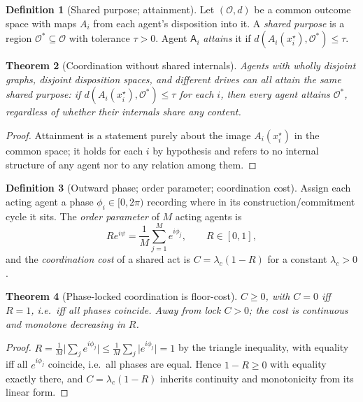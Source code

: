 \documentclass[11pt,a4paper]{article}
\theoremstyle{clstyle}
\newtheorem{theorem}{Theorem}[section]
\theoremstyle{definition}
\newtheorem{definition}[theorem]{Definition}
\theoremstyle{remark}
\newcommand{\Ag}{\mathsf{A}}
\newcommand{\Ord}{R}
\newcommand{\abs}[1]{\lvert#1\rvert}
\begin{document}
\begin{definition}[Shared purpose; attainment]
\label{def:shared}
Let $(\mathcal{O},d)$ be a common outcome space with maps
$A_i$ from each agent's disposition into it. A \emph{shared purpose} is a
region $\mathcal{O}^{*}\subseteq\mathcal{O}$ with tolerance $\tau>0$. Agent
$\Ag_i$ \emph{attains} it if $d(A_i(x_i^{\star}),\mathcal{O}^{*})\le\tau$.
\end{definition}

\begin{theorem}[Coordination without shared internals]
\label{thm:coord}
Agents with wholly disjoint graphs, disjoint disposition spaces, and
different drives can all attain the same shared purpose: if
$d(A_i(x_i^{\star}),\mathcal{O}^{*})\le\tau$ for each $i$, then every agent
attains $\mathcal{O}^{*}$, regardless of whether their internals share any
content.
\end{theorem}

\begin{proof}
Attainment is a statement purely about the image $A_i(x_i^{\star})$ in the
common space; it holds for each $i$ by hypothesis and refers to no internal
structure of any agent nor to any relation among them.
\end{proof}

\begin{definition}[Outward phase; order parameter; coordination cost]
\label{def:order}
Assign each acting agent a phase $\phi_i\in[0,2\pi)$ recording where in its
construction/commitment cycle it sits. The \emph{order parameter} of $M$
acting agents is
\[
\Ord e^{i\psi}=\frac1M\sum_{j=1}^{M}e^{i\phi_j},\qquad \Ord\in[0,1],
\]
and the \emph{coordination cost} of a shared act is $C=\lambda_c(1-\Ord)$
for a constant $\lambda_c>0$.
\end{definition}

\begin{theorem}[Phase-locked coordination is floor-cost]
\label{thm:phaselock}
$C\ge0$, with $C=0$ iff $\Ord=1$, i.e.\ iff all phases coincide. Away from
lock $C>0$; the cost is continuous and monotone decreasing in $\Ord$.
\end{theorem}

\begin{proof}
$\Ord=\frac1M\abs{\sum_j e^{i\phi_j}}\le\frac1M\sum_j\abs{e^{i\phi_j}}=1$ by
the triangle inequality, with equality iff all $e^{i\phi_j}$ coincide, i.e.\
all phases are equal. Hence $1-\Ord\ge0$ with equality exactly there, and
$C=\lambda_c(1-\Ord)$ inherits continuity and monotonicity from its linear
form.
\end{proof}
\end{document}
